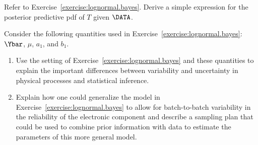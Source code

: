 \begin{exercise}
Refer to
Exercise~\ref{exercise:lognormal.bayes}.
Derive a simple expression for the posterior predictive pdf of $T$
given $\DATA$.
\end{exercise}

\begin{exercise}
Consider the following quantities used in
Exercise~\ref{exercise:lognormal.bayes}: $\Ybar$, $\mu$, $a_{1}$, and
$b_{1}$. 
\begin{enumerate}
\item
Use the setting of Exercise~\ref{exercise:lognormal.bayes}
and these quantities to explain the important differences between
variability and uncertainty in physical processes and statistical
inference.
\item
Explain how one could generalize the model in
Exercise~\ref{exercise:lognormal.bayes} to allow for batch-to-batch
variability in the reliability of the electronic component and
describe a sampling plan that could be used to combine prior
information with data to estimate the parameters of this more general
model.
\end{enumerate}
\end{exercise}

